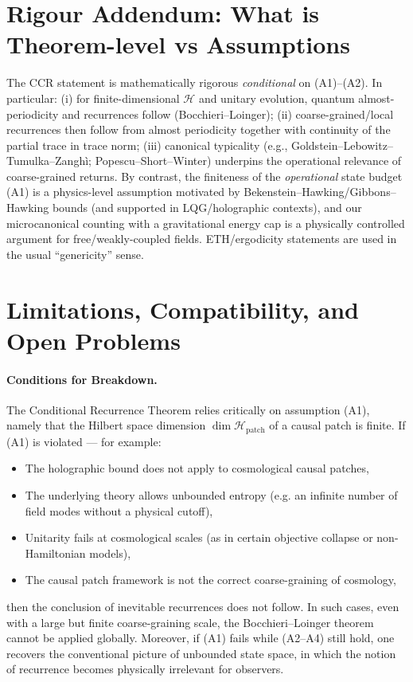 \documentclass[12pt]{article}
\theoremstyle{remark}
\begin{document}
\section{Rigour Addendum: What is Theorem-level vs Assumptions}\label{sec:rigour-addendum}
The CCR statement is mathematically rigorous \emph{conditional} on (A1)--(A2). In particular:
(i) for finite-dimensional $\mathcal H$ and unitary evolution, quantum almost-periodicity and recurrences follow (Bocchieri--Loinger);
(ii) coarse-grained/local recurrences then follow from almost periodicity together with continuity of the partial trace in trace norm;
(iii) canonical typicality (e.g., Goldstein--Lebowitz--Tumulka--Zangh\`i; Popescu--Short--Winter) underpins the operational relevance of coarse-grained returns.
By contrast, the finiteness of the \emph{operational} state budget (A1) is a physics-level assumption motivated by Bekenstein--Hawking/Gibbons--Hawking bounds (and supported in LQG/holographic contexts), and our microcanonical counting with a gravitational energy cap is a physically controlled argument for free/weakly-coupled fields. ETH/ergodicity statements are used in the usual ``genericity'' sense.


\section{Limitations, Compatibility, and Open Problems}

\paragraph{Conditions for Breakdown.}
The Conditional Recurrence Theorem relies critically on assumption (A1), namely that the Hilbert space dimension
$\dim\mathcal{H}_{\mathrm{patch}}$ of a causal patch is finite.
If (A1) is violated — for example:
\begin{itemize}
    \item The holographic bound does not apply to cosmological causal patches,
    \item The underlying theory allows unbounded entropy (e.g. an infinite number of field modes without a physical cutoff),
    \item Unitarity fails at cosmological scales (as in certain objective collapse or non-Hamiltonian models),
    \item The causal patch framework is not the correct coarse-graining of cosmology,
\end{itemize}
then the conclusion of inevitable recurrences does not follow.
In such cases, even with a large but finite coarse-graining scale, the Bocchieri–Loinger theorem cannot be applied globally.
Moreover, if (A1) fails while (A2–A4) still hold, one recovers the conventional picture of unbounded state space, in which the notion of recurrence becomes physically irrelevant for observers.
\end{document}
